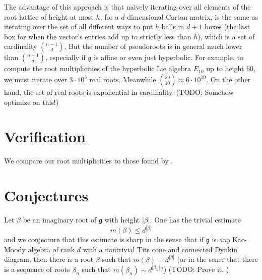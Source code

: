 \documentclass[12pt]{report}
\newcommand{\g}{\mathfrak g}
\theoremstyle{definition}
\begin{document}
The advantage of this approach is that naively iterating over all elements of the root lattice of height at most $h$, for a $d$-dimensional Cartan matrix, is the same as iterating over the set of all different ways to put $h$ balls in $d + 1$ boxes (the last box for when the vector's entries add up to strictly less than $h$), which is a set of cardinality $\binom{n-1}d$. But the number of pseudoroots is in general much lower than $\binom{n-1}d$, especially if $\g$ is affine or even just hyperbolic. For example, to compute the root multiplicities of the hyperbolic Lie algebra $E_{10}$ up to height $60$, we must iterate over $3 \cdot 10^3$ real roots. Meanwhile $\binom{59}{10} \approx 6 \cdot 10^{10}$. On the other hand, the set of real roots is exponential in cardinality. (TODO: Somehow optimize on this!)


\section{Verification}
We compare our root multiplicities to those found by \cite{kleinschmidt2004e11}.


\section{Conjectures}
Let $\beta$ be an imaginary root of $\g$ with height $|\beta|$. One has the trivial estimate
$$m(\beta) \leq d^{|\beta|}$$
and we conjecture that this estimate is sharp in the sense that if $\g$ is \emph{any} Kac-Moody algebra of rank $d$ with a nontrivial Tits cone and connected Dynkin diagram, then there is a root $\beta$ such that $m(\beta) = d^{|\beta|}$ (or in the sense that there is a sequence of roots $\beta_n$ such that $m(\beta_n) \sim d^{|\beta_n|}$?) (TODO: Prove it.	)



{}

\end{document}
